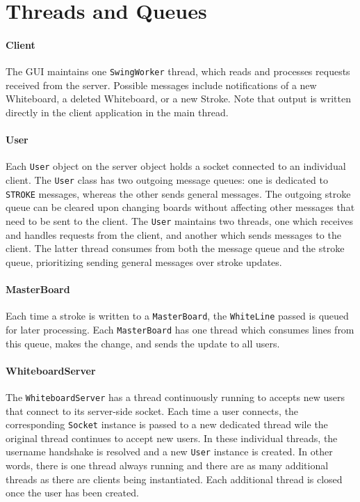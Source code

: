 \section{Threads and Queues}

\paragraph{Client} The GUI maintains one \texttt{SwingWorker} thread, which reads and processes requests received from the server. Possible messages include notifications of a new Whiteboard, a deleted Whiteboard, or a new Stroke. Note that output is written directly in the client application in the main thread.

\paragraph{User} Each \texttt{User} object on the server object holds a socket connected to an individual client. The \texttt{User} class has two outgoing message queues: one is dedicated to \texttt{STROKE} messages, whereas the other sends general messages. The outgoing stroke queue can be cleared upon changing boards without affecting other messages that need to be sent to the client. The \texttt{User} maintains two threads, one which receives and handles requests from the client, and another which sends messages to the client. The latter thread consumes from both the message queue and the stroke queue, prioritizing sending general messages over stroke updates.

\paragraph{MasterBoard} Each time a stroke is written to a \texttt{MasterBoard}, the \texttt{WhiteLine} passed is queued for later processing. Each \texttt{MasterBoard} has one thread which consumes lines from this queue, makes the change, and sends the update to all users.

\paragraph{WhiteboardServer} The \texttt{WhiteboardServer} has a thread continuously running to accepts new users that connect to its server-side socket. Each time a user connects, the corresponding \texttt{Socket} instance is passed to a new dedicated thread wile the original thread continues to accept new users. In these individual threads, the username handshake is resolved and a new \texttt{User} instance is created. In other words, there is one thread always running and there are as many additional threads as there are clients being instantiated. Each additional thread is closed once the user has been created.

